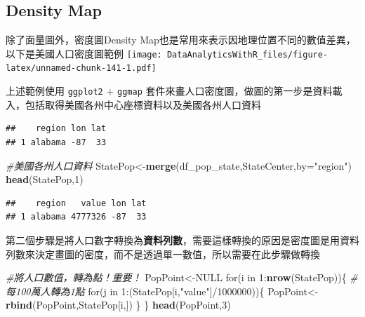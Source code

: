 \documentclass[]{book}
\newenvironment{Shaded}{\begin{snugshade}}{\end{snugshade}}
\newcommand{\KeywordTok}[1]{\textcolor[rgb]{0.13,0.29,0.53}{\textbf{{#1}}}}
\newcommand{\DataTypeTok}[1]{\textcolor[rgb]{0.13,0.29,0.53}{{#1}}}
\newcommand{\DecValTok}[1]{\textcolor[rgb]{0.00,0.00,0.81}{{#1}}}
\newcommand{\StringTok}[1]{\textcolor[rgb]{0.31,0.60,0.02}{{#1}}}
\newcommand{\CommentTok}[1]{\textcolor[rgb]{0.56,0.35,0.01}{\textit{{#1}}}}
\newcommand{\OtherTok}[1]{\textcolor[rgb]{0.56,0.35,0.01}{{#1}}}
\newcommand{\NormalTok}[1]{{#1}}
\theoremstyle{definition}
\theoremstyle{definition}
\theoremstyle{remark}
\begin{document}
\subsection{Density Map}\label{density-map}

除了面量圖外，密度圖Density
Map也是常用來表示因地理位置不同的數值差異，以下是美國人口密度圖範例
\texttt{[image: DataAnalyticsWithR\_files/figure-latex/unnamed-chunk-141-1.pdf]}

上述範例使用 \texttt{ggplot2} + \texttt{ggmap}
套件來畫人口密度圖，做圖的第一步是資料載入，包括取得美國各州中心座標資料以及美國各州人口資料

\begin{Shaded}
\end{Shaded}

\begin{verbatim}
##    region lon lat
## 1 alabama -87  33
\end{verbatim}

\begin{Shaded}
\begin{Highlighting}[]
\CommentTok{#美國各州人口資料}
\NormalTok{StatePop<-}\KeywordTok{merge}\NormalTok{(df_pop_state,StateCenter,}\DataTypeTok{by=}\StringTok{"region"}\NormalTok{) }
\KeywordTok{head}\NormalTok{(StatePop,}\DecValTok{1}\NormalTok{)}
\end{Highlighting}
\end{Shaded}

\begin{verbatim}
##    region   value lon lat
## 1 alabama 4777326 -87  33
\end{verbatim}

第二個步驟是將人口數字轉換為\textbf{資料列數}，需要這樣轉換的原因是密度圖是用資料列數來決定畫圖的密度，而不是透過單一數值，所以需要在此步驟做轉換

\begin{Shaded}
\begin{Highlighting}[]
\CommentTok{#將人口數值，轉為點！重要！}
\NormalTok{PopPoint<-}\OtherTok{NULL} 
\NormalTok{for(i in }\DecValTok{1}\NormalTok{:}\KeywordTok{nrow}\NormalTok{(StatePop))\{}
    \CommentTok{#每100萬人轉為1點}
    \NormalTok{for(j in }\DecValTok{1}\NormalTok{:(StatePop[i,}\StringTok{"value"}\NormalTok{]/}\DecValTok{1000000}\NormalTok{))\{}
        \NormalTok{PopPoint<-}\KeywordTok{rbind}\NormalTok{(PopPoint,StatePop[i,])   }
    \NormalTok{\}}
\NormalTok{\}}
\KeywordTok{head}\NormalTok{(PopPoint,}\DecValTok{3}\NormalTok{)}
\end{Highlighting}
\end{Shaded}
\end{document}
